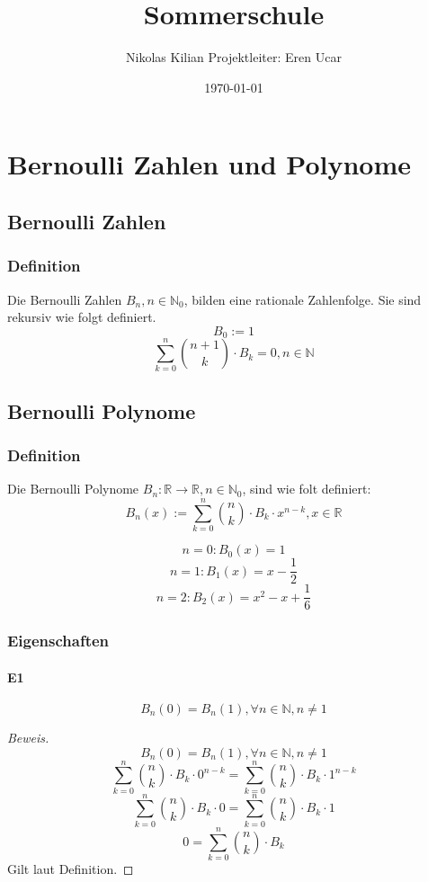 \documentclass[12pt]{article}
\begin{document}
\title{\vspace{-2.0cm}Sommerschule}
\author{Nikolas Kilian
Projektleiter: Eren Ucar}
\date{\today}
\maketitle

\tableofcontents

\section{Bernoulli Zahlen und Polynome}
\subsection{Bernoulli Zahlen}
\subsubsection{Definition}

Die Bernoulli Zahlen \(B_n, n \in \mathbb{N}_0\), bilden eine rationale Zahlenfolge.
Sie sind rekursiv wie folgt definiert.
\[B_0 := 1\]
\[\sum_{k=0}^n {n+1 \choose k} \cdot B_k = 0, n \in \mathbb{N}\]

\subsection{Bernoulli Polynome}
\subsubsection{Definition}

Die Bernoulli Polynome \(B_n:\mathbb{R}\to\mathbb{R},n\in\mathbb{N}_0\), sind wie folt definiert:
\[B_n(x) := \sum_{k=0}^n {n \choose k} \cdot B_k \cdot x^{n-k}, x\in\mathbb{R}\]

\[n = 0: B_0(x) = 1\]
\[n = 1: B_1(x) = x - \frac{1}{2}\]
\[n = 2: B_2(x) = x^2 - x + \frac{1}{6}\]

\subsubsection{Eigenschaften}
\paragraph{E1} 
\[B_n(0) = B_n(1), \forall n\in\mathbb{N}, n \neq 1\]

\begin{proof}[Beweis]
\[B_n(0) = B_n(1), \forall n\in\mathbb{N}, n \neq 1\]
\[\sum_{k=0}^n {n \choose k} \cdot B_k \cdot 0^{n-k} = \sum_{k=0}^n {n \choose k} \cdot B_k \cdot 1^{n-k}\]
\[\sum_{k=0}^n {n \choose k} \cdot B_k \cdot 0 = \sum_{k=0}^n {n \choose k} \cdot B_k \cdot 1\]
\[0 = \sum_{k=0}^n {n \choose k} \cdot B_k\]
Gilt laut Definition.
\end{proof}
\end{document}
